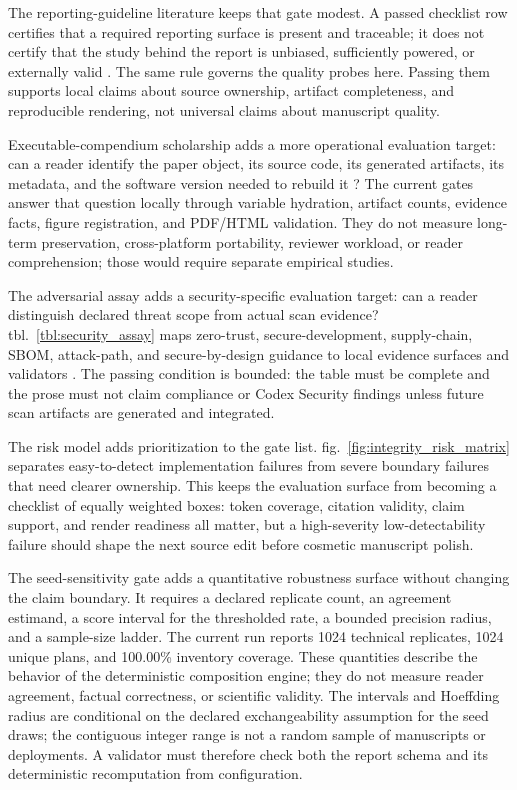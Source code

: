 \documentclass[
  english,
]{article}
\begin{document}
The reporting-guideline literature keeps that gate modest. A passed
checklist row certifies that a required reporting surface is present and
traceable; it does not certify that the study behind the report is
unbiased, sufficiently powered, or externally valid
\citep{equator_network_reporting_guidelines, vonelm2007strobe, percie_du_sert2020arrive}.
The same rule governs the quality probes here. Passing them supports
local claims about source ownership, artifact completeness, and
reproducible rendering, not universal claims about manuscript quality.

Executable-compendium scholarship adds a more operational evaluation
target: can a reader identify the paper object, its source code, its
generated artifacts, its metadata, and the software version needed to
rebuild it
\citep{nuest2017erc, chen2021metadata, smith2016softwarecitation}? The
current gates answer that question locally through variable hydration,
artifact counts, evidence facts, figure registration, and PDF/HTML
validation. They do not measure long-term preservation, cross-platform
portability, reviewer workload, or reader comprehension; those would
require separate empirical studies.

The adversarial assay adds a security-specific evaluation target: can a
reader distinguish declared threat scope from actual scan evidence?
tbl.~\ref{tbl:security_assay} maps zero-trust, secure-development,
supply-chain, SBOM, attack-path, and secure-by-design guidance to local
evidence surfaces and validators
\citep{nist_sp800_207_zero_trust, nist_sp800_218_ssdf, slsa_v1_2, sigstore_docs, mitre_attack, cyclonedx_spec, spdx_spec, cisa_secure_by_design}.
The passing condition is bounded: the table must be complete and the
prose must not claim compliance or Codex Security findings unless future
scan artifacts are generated and integrated.

The risk model adds prioritization to the gate list.
fig.~\ref{fig:integrity_risk_matrix} separates easy-to-detect
implementation failures from severe boundary failures that need clearer
ownership. This keeps the evaluation surface from becoming a checklist
of equally weighted boxes: token coverage, citation validity, claim
support, and render readiness all matter, but a high-severity
low-detectability failure should shape the next source edit before
cosmetic manuscript polish.

The seed-sensitivity gate adds a quantitative robustness surface without
changing the claim boundary. It requires a declared replicate count, an
agreement estimand, a score interval for the thresholded rate, a bounded
precision radius, and a sample-size ladder. The current run reports 1024
technical replicates, 1024 unique plans, and 100.00\% inventory
coverage. These quantities describe the behavior of the deterministic
composition engine; they do not measure reader agreement, factual
correctness, or scientific validity. The intervals and Hoeffding radius
are conditional on the declared exchangeability assumption for the seed
draws; the contiguous integer range is not a random sample of
manuscripts or deployments. A validator must therefore check both the
report schema and its deterministic recomputation from configuration.
\end{document}
